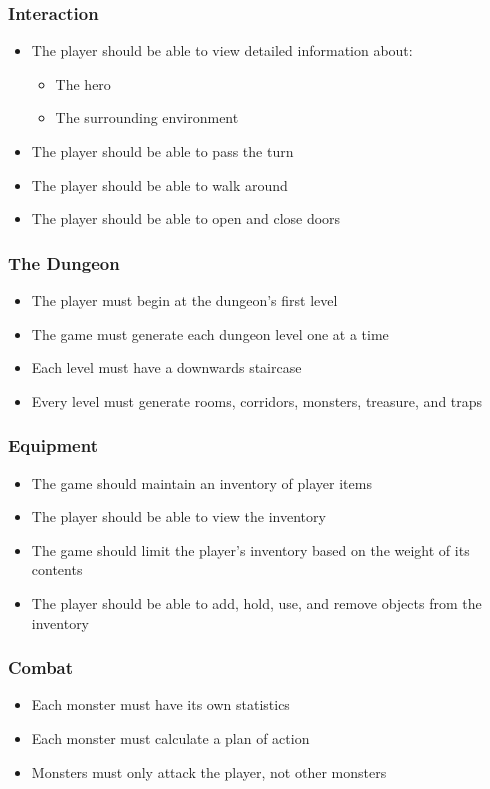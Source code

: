 \documentclass[12pt, titlepage]{article}
\begin{document}
		\subsubsection{Interaction}
		\begin{itemize}
			\item The player should be able to view detailed information about:
			\begin{itemize}
				\item The hero
				\item The surrounding environment
			\end{itemize}
			\item The player should be able to pass the turn
			\item The player should be able to walk around
			\item The player should be able to open and close doors
		\end{itemize}

		\subsubsection{The Dungeon}
			\begin{itemize}
				\item The player must begin at the dungeon's first level
				\item The game must generate each dungeon level one at a time
				\item Each level must have a downwards staircase
				\item Every level must generate rooms, corridors, monsters, treasure, and traps
			\end{itemize}

		\subsubsection{Equipment}
			\begin{itemize}
				\item The game should maintain an inventory of player items
				\item The player should be able to view the inventory
				\item The game should limit the player's inventory based on the weight of its contents
				\item The player should be able to add, hold, use, and remove objects from the inventory
			\end{itemize}

		\subsubsection{Combat}
		\begin{itemize}
			\item Each monster must have its own statistics
			\item Each monster must calculate a plan of action
			\item Monsters must only attack the player, not other monsters

		\end{itemize}
\end{document}
